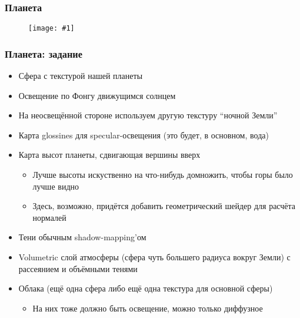 \documentclass{beamer}
\newcommand{\slideimage}[1]{
  \begin{figure}
    \begin{adjustbox}{width=\textwidth, totalheight=\textheight-2\baselineskip-2\baselineskip,keepaspectratio}
      \texttt{[image: \#1]}
    \end{adjustbox}
  \end{figure}
}
\begin{document}
\begin{frame}
\frametitle{Планета}
\slideimage{planet.jpg}
\end{frame}

\begin{frame}[fragile]
\frametitle{Планета: задание}
\fontsize{8pt}{8pt}
\selectfont
\begin{itemize}
\item Сфера с текстурой нашей планеты
\item Освещение по Фонгу движущимся солнцем
\item На неосвещённой стороне используем другую текстуру ``ночной Земли''
\item Карта glossines для specular-освещения (это будет, в основном, вода)
\item Карта высот планеты, сдвигающая вершины вверх
\begin{itemize}
\fontsize{8pt}{8pt}
\selectfont
\item Лучше высоты искуственно на что-нибудь домножить, чтобы горы было лучше видно
\item Здесь, возможно, придётся добавить геометрический шейдер для расчёта нормалей
\end{itemize}
\item Тени обычным shadow-mapping'ом
\item Volumetric слой атмосферы (сфера чуть большего радиуса вокруг Земли) с рассеянием и объёмными тенями
\item Облака (ещё одна сфера либо ещё одна текстура для основной сферы)
\begin{itemize}
\fontsize{8pt}{8pt}
\selectfont
\item На них тоже должно быть освещение, можно только диффузное
\end{itemize}
\end{itemize}
\end{frame}
\end{document}

